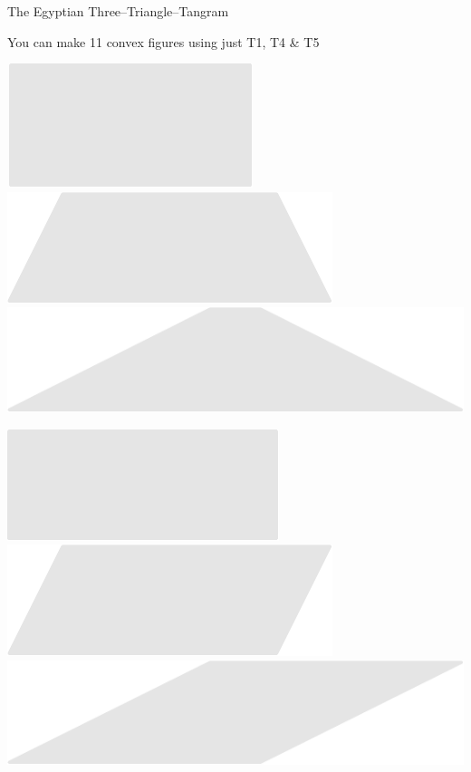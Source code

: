 \documentclass[14pt]{beamer}
\begin{document}
    \begin{frame}{The Egyptian Three--Triangle--Tangram}
        \begin{center}
            You can make 11 convex figures using just T1, T4 \& T5

            \bigskip \bigskip

            \;\,\includegraphics[scale=0.39]{figures/figure004a.pdf}\,\;\qquad
            \includegraphics[scale=0.39]{figures/figure004e.pdf}\qquad
            \includegraphics[scale=0.39]{figures/figure004f.pdf}\\

            \bigskip\medskip

            \;\;\includegraphics[scale=0.39]{figures/figure004b.pdf}\qquad
            \includegraphics[scale=0.39]{figures/figure004h.pdf}\qquad
            \includegraphics[scale=0.39]{figures/figure004i.pdf}\\


\end{center}
\end{frame}
\end{document}
